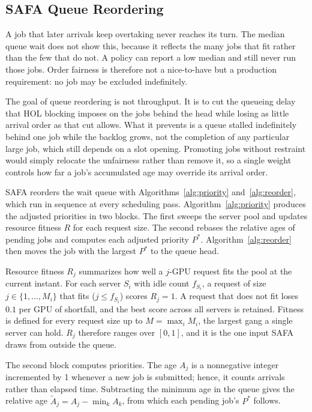 \documentclass{ieeetj}
\begin{document}
\subsection{SAFA Queue Reordering}
A job that later arrivals keep overtaking never reaches its turn. The median queue wait does not show this, because it reflects the many jobs that fit rather than the few that do not. A policy can report a low median and still never run those jobs. Order fairness is therefore not a nice-to-have but a production requirement: no job may be excluded indefinitely.

The goal of queue reordering is not throughput. It is to cut the queueing delay that HOL blocking imposes on the jobs behind the head while losing as little arrival order as that cut allows. What it prevents is a queue stalled indefinitely behind one job while the backlog grows, not the completion of any particular large job, which still depends on a slot opening. Promoting jobs without restraint would simply relocate the unfairness rather than remove it, so a single weight controls how far a job's accumulated age may override its arrival order.

SAFA reorders the wait queue with Algorithms~\ref{alg:priority} and~\ref{alg:reorder}, which run in sequence at every scheduling pass. Algorithm~\ref{alg:priority} produces the adjusted priorities in two blocks. The first sweeps the server pool and updates resource fitness $R$ for each request size. The second rebases the relative ages of pending jobs and computes each adjusted priority $P^*$. Algorithm~\ref{alg:reorder} then moves the job with the largest $P^*$ to the queue head.

Resource fitness $R_j$ summarizes how well a $j$-GPU request fits the pool at the current instant. For each server $S_i$ with idle count $f_{S_i}$, a request of size $j\in\{1,\dots,M_i\}$ that fits ($j\le f_{S_i}$) scores $R_j=1$. A request that does not fit loses $0.1$ per GPU of shortfall, and the best score across all servers is retained. Fitness is defined for every request size up to $M=\max_i M_i$, the largest gang a single server can hold. $R_j$ therefore ranges over $[0,1]$, and it is the one input SAFA draws from outside the queue.

The second block computes priorities. The age $A_j$ is a nonnegative integer incremented by 1 whenever a new job is submitted; hence, it counts arrivals rather than elapsed time. Subtracting the minimum age in the queue gives the relative age $\tilde A_j=A_j-\min_k A_k$, from which each pending job's $P^*$ follows.
\end{document}
